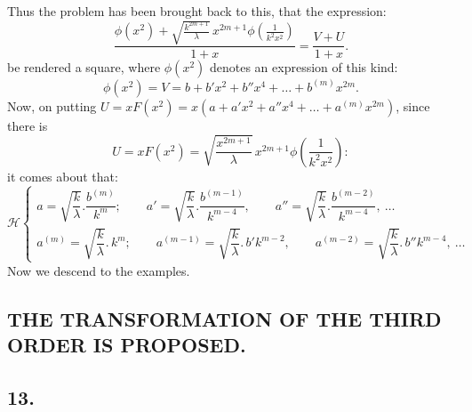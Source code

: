 \documentclass{article}
\begin{document}
Thus the problem has been brought back to this, that the expression:
\[
\frac{\phi(x^{2})+\sqrt{\frac{k^{2m+1}}{\lambda}}\,x^{2m+1}\phi\left(\frac{1}{k^{2}x^{2}}\right)}{1+x}=\frac{V+U}{1+x}.
\]
be rendered a square, where $\phi(x^{2})$ denotes an expression of this kind:
\[
\phi(x^{2})=V=b+b'x^{2}+b''x^{4}+\ldots+b^{(m)}x^{2m}.
\]
Now, on putting $U=xF(x^{2})=x\left(a+a'x^{2}+a''x^{4}+\ldots+a^{(m)}x^{2m}\right)$, since there is
\[
U=xF(x^{2})=\sqrt{\frac{x^{2m+1}}{\lambda}}\,x^{2m+1}\phi\left(\frac{1}{k^{2}x^{2}}\right):
\]
it comes about that:
\[
\mathcal{H}\left\{
\begin{array}{l}
a=\sqrt{\dfrac{k}{\lambda}}.\dfrac{b^{(m)}}{k^{m}};\qquad a'=\sqrt{\dfrac{k}{\lambda}}.\dfrac{b^{(m-1)}}{k^{m-4}},\qquad a''=\sqrt{\dfrac{k}{\lambda}}.\dfrac{b^{(m-2)}}{k^{m-4}},\ \ldots\\[2.5ex]
a^{(m)}=\sqrt{\dfrac{k}{\lambda}}.\,k^{m};\qquad a^{(m-1)}=\sqrt{\dfrac{k}{\lambda}}.\,b'k^{m-2},\qquad a^{(m-2)}=\sqrt{\dfrac{k}{\lambda}}.\,b''k^{m-4},\ \ldots
\end{array}
\right.
\] 
Now we descend to the examples.


\subsection*{THE TRANSFORMATION OF THE THIRD ORDER IS PROPOSED.}

\subsection*{13.}
\end{document}
